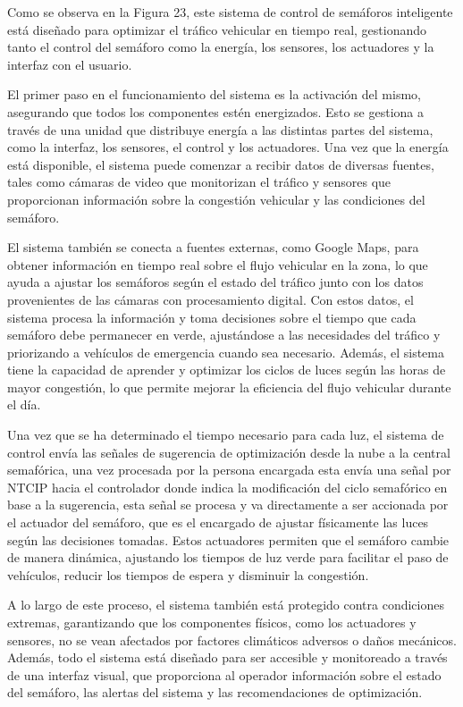 \documentclass[12pt,a4paper,oneside]{report}
\begin{document}
Como se observa en la Figura 23, este sistema de control de semáforos inteligente está diseñado para optimizar el tráfico vehicular en tiempo real, gestionando tanto el control del semáforo como la energía, los sensores, los actuadores y la interfaz con el usuario.

El primer paso en el funcionamiento del sistema es la activación del mismo, asegurando que todos los componentes estén energizados. Esto se gestiona a través de una unidad que distribuye energía a las distintas partes del sistema, como la interfaz, los sensores, el control y los actuadores. Una vez que la energía está disponible, el sistema puede comenzar a recibir datos de diversas fuentes, tales como cámaras de video que monitorizan el tráfico y sensores que proporcionan información sobre la congestión vehicular y las condiciones del semáforo.

El sistema también se conecta a fuentes externas, como Google Maps, para obtener información en tiempo real sobre el flujo vehicular en la zona, lo que ayuda a ajustar los semáforos según el estado del tráfico junto con los datos provenientes de las cámaras con procesamiento digital. Con estos datos, el sistema procesa la información y toma decisiones sobre el tiempo que cada semáforo debe permanecer en verde, ajustándose a las necesidades del tráfico y priorizando a vehículos de emergencia cuando sea necesario. Además, el sistema tiene la capacidad de aprender y optimizar los ciclos de luces según las horas de mayor congestión, lo que permite mejorar la eficiencia del flujo vehicular durante el día.

Una vez que se ha determinado el tiempo necesario para cada luz, el sistema de control envía las señales de sugerencia de optimización desde la nube a la central semafórica, una vez procesada por la persona encargada esta envía una señal por NTCIP hacia el controlador donde indica la modificación del ciclo semafórico en base a la sugerencia, esta señal se procesa y va directamente a ser accionada por el actuador del semáforo, que es el encargado de ajustar físicamente las luces según las decisiones tomadas. Estos actuadores permiten que el semáforo cambie de manera dinámica, ajustando los tiempos de luz verde para facilitar el paso de vehículos, reducir los tiempos de espera y disminuir la congestión.

A lo largo de este proceso, el sistema también está protegido contra condiciones extremas, garantizando que los componentes físicos, como los actuadores y sensores, no se vean afectados por factores climáticos adversos o daños mecánicos. Además, todo el sistema está diseñado para ser accesible y monitoreado a través de una interfaz visual, que proporciona al operador información sobre el estado del semáforo, las alertas del sistema y las recomendaciones de optimización.
\end{document}
